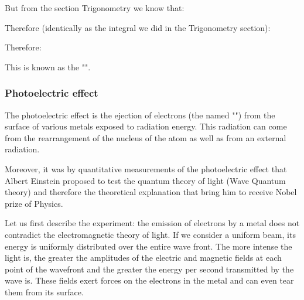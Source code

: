 	But from the section Trigonometry we know that:
	
	Therefore (identically as the integral we did in the Trigonometry section):
	
	Therefore:
		
	This is known as the "".
	
	\subsubsection{Photoelectric effect}
	The photoelectric effect is the ejection of electrons (the named "") from the surface of various metals exposed to radiation energy. This radiation can come from the rearrangement of the nucleus of the atom as well as from an external radiation.

	Moreover, it was by quantitative measurements of the photoelectric effect that Albert Einstein proposed to test the quantum theory of light (Wave Quantum theory) and therefore the theoretical explanation that bring him to receive Nobel prize of Physics.

	Let us first describe the experiment: the emission of electrons by a metal does not contradict the electromagnetic theory of light. If we consider a uniform beam, its energy is uniformly distributed over the entire wave front. The more intense the light is, the greater the amplitudes of the electric and magnetic fields at each point of the wavefront and the greater the energy per second transmitted by the wave is. These fields exert forces on the electrons in the metal and can even tear them from its surface.

